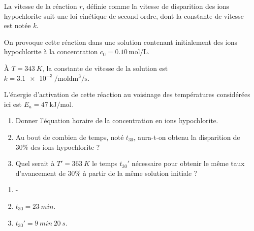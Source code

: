 La vitesse de la réaction $r$, définie comme la vitesse de disparition des ions hypochlorite  suit une loi cinétique de second ordre, dont la constante de vitesse est notée $k$.

On provoque cette réaction dans une solution contenant initialement des ions hypochlorite à la concentration $c_0 = \SI{0.10}{\mol\per\liter}$.

À $T = \SI{343}{K}$, la constante de vitesse de la solution est $k = \SI{3.1e-3}{\per\mol \deci \meter \cubed \per \second}$. 

L’énergie d’activation de cette réaction au voisinage des températures considérées ici est $E_a = \SI{47}{\kilo\joule\per\mol}$.

\begin{enumerate}
	\item Donner l’équation horaire de la concentration en ions hypochlorite.
	\item Au bout de combien de temps, noté $t_{30}$, aura-t-on obtenu la disparition de $30\%$ des ions hypochlorite ?
	\item Quel serait à $T' = \SI{363}{K}$ le temps $t_{30}'$ nécessaire pour obtenir le même taux d'avancement de $30 \%$ à partir de la même solution initiale ?
\end{enumerate}

\begin{enumerate}
	\item -
	\item $t_{30} = \SI{23}{min}$.
	\item $t_{30}' = \SI{9}{min}~\SI{20}{s}$.
\end{enumerate}